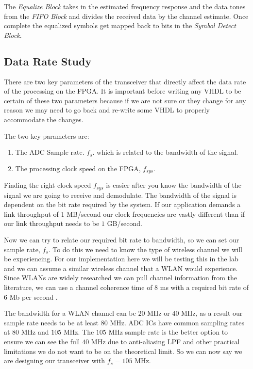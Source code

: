 The \emph{Equalize Block} takes in the estimated frequency response and the data tones from the \emph{\ac{FIFO} Block} and divides the received data by the channel estimate. Once complete the equalized symbols get mapped back to bits in the \emph{Symbol Detect Block}.

\subsection{Data Rate Study}
 
There are two key parameters of the transceiver that directly affect the data rate of the processing on the \ac{FPGA}. It is important before writing any \ac{VHDL} to be certain of these two parameters because if we are not sure or they change for any reason we may need to go back and re-write some \ac{VHDL} to properly accommodate the changes.

The two key parameters are:
\begin{enumerate}
\item{The \ac{ADC} Sample rate. $f_s$. which is related to the bandwidth of the signal.}
\item{The processing clock speed on the \ac{FPGA}, $f_{sys}$.}
\end{enumerate}
 
Finding the right clock speed $f_{sys}$ is easier after you know the bandwidth of the signal we are going to receive and demodulate. The bandwidth of the signal is dependent on the bit rate required by the system. If our application demands a link throughput of $1$ \ac{MB}/second our clock frequencies are vastly different than if our link throughput needs to be $1$ \ac{GB}/second.

Now we can try to relate our required bit rate to bandwidth, so we can set our sample rate, $f_s$. To do this we need to know the type of wireless channel we will be experiencing. For our implementation here we will be testing this in the lab and we can assume a similar wireless channel that a \ac{WLAN} would experience. Since \ac{WLAN}s are widely researched we can pull channel information from the literature, we can use a channel coherence time of $8$ \ac{ms} with a required bit rate of $6$ \ac{Mb} per second \cite{jung2011react}.

The bandwidth for a \ac{WLAN} channel can be $20$ \ac{MHz} or $40$ \ac{MHz}, as a result our sample rate needs to be at least $80$ \ac{MHz}. \ac{ADC} \ac{IC}s have common sampling rates at $80$ \ac{MHz} and $105$ \ac{MHz}. The $105$ \ac{MHz} sample rate is the better option to ensure we can see the full $40$ \ac{MHz} due to anti-aliasing \ac{LPF} and other practical limitations we do not want to be on the theoretical limit. So we can now say we are designing our transceiver with $f_s = 105$ \ac{MHz}.

